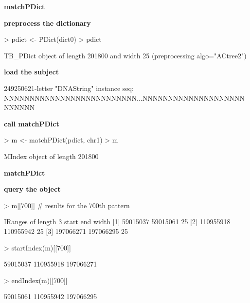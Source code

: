 \documentclass[pdf]{beamer}
\begin{document}
\begin{frame}[fragile]
\textbf{matchPDict}
\begin{block}{}
\begin{footnotesize}
\textbf{preprocess the dictionary}
\begin{Schunk}
\begin{Sinput}
> pdict <- PDict(dict0)
> pdict
\end{Sinput}
\begin{Soutput}
TB_PDict object of length 201800 and width 25 (preprocessing algo="ACtree2")
\end{Soutput}
\end{Schunk}
\textbf{load the subject}
\begin{Schunk}
\begin{Soutput}
  249250621-letter "DNAString" instance
seq: NNNNNNNNNNNNNNNNNNNNNNNNNN...NNNNNNNNNNNNNNNNNNNNNNNNNN
\end{Soutput}
\end{Schunk}
\textbf{call matchPDict}
\begin{Schunk}
\begin{Sinput}
> m <- matchPDict(pdict, chr1)
> m
\end{Sinput}
\begin{Soutput}
MIndex object of length 201800
\end{Soutput}
\end{Schunk}
\end{footnotesize}
\end{block}
\end{frame}


\begin{frame}[fragile]
\textbf{matchPDict}
\begin{block}{}
\begin{footnotesize}
\textbf{query the object}
\begin{Schunk}
\begin{Sinput}
> m[[700]] # results for the 700th pattern
\end{Sinput}
\begin{Soutput}
IRanges of length 3
        start       end width
[1]  59015037  59015061    25
[2] 110955918 110955942    25
[3] 197066271 197066295    25
\end{Soutput}
\begin{Sinput}
> startIndex(m)[[700]]
\end{Sinput}
\begin{Soutput}
[1]  59015037 110955918 197066271
\end{Soutput}
\begin{Sinput}
> endIndex(m)[[700]] 
\end{Sinput}
\begin{Soutput}
[1]  59015061 110955942 197066295
\end{Soutput}
\end{Schunk}
\end{footnotesize}
\end{block}
\end{frame}
\end{document}
